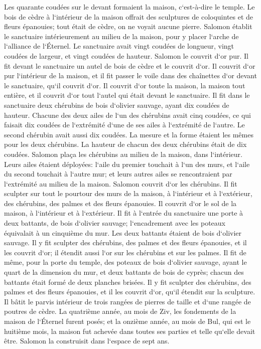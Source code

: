 \verse Les quarante coudées sur le devant formaient la maison, c`est-à-dire le temple. 
\verse Le bois de cèdre à l`intérieur de la maison offrait des sculptures de coloquintes et de fleurs épanouies; tout était de cèdre, on ne voyait aucune pierre. 
\verse Salomon établit le sanctuaire intérieurement au milieu de la maison, pour y placer l`arche de l`alliance de l`Éternel. 
\verse Le sanctuaire avait vingt coudées de longueur, vingt coudées de largeur, et vingt coudées de hauteur. Salomon le couvrit d`or pur. Il fit devant le sanctuaire un autel de bois de cèdre et le couvrit d`or. 
\verse Il couvrit d`or pur l`intérieur de la maison, et il fit passer le voile dans des chaînettes d`or devant le sanctuaire, qu`il couvrit d`or. 
\verse Il couvrit d`or toute la maison, la maison tout entière, et il couvrit d`or tout l`autel qui était devant le sanctuaire. 
\verse Il fit dans le sanctuaire deux chérubins de bois d`olivier sauvage, ayant dix coudées de hauteur. 
\verse Chacune des deux ailes de l`un des chérubins avait cinq coudées, ce qui faisait dix coudées de l`extrémité d`une de ses ailes à l`extrémité de l`autre. 
\verse Le second chérubin avait aussi dix coudées. La mesure et la forme étaient les mêmes pour les deux chérubins. 
\verse La hauteur de chacun des deux chérubins était de dix coudées. 
\verse Salomon plaça les chérubins au milieu de la maison, dans l`intérieur. Leurs ailes étaient déployées: l`aile du premier touchait à l`un des murs, et l`aile du second touchait à l`autre mur; et leurs autres ailes se rencontraient par l`extrémité au milieu de la maison. 
\verse Salomon couvrit d`or les chérubins. 
\verse Il fit sculpter sur tout le pourtour des murs de la maison, à l`intérieur et à l`extérieur, des chérubins, des palmes et des fleurs épanouies. 
\verse Il couvrit d`or le sol de la maison, à l`intérieur et à l`extérieur. 
\verse Il fit à l`entrée du sanctuaire une porte à deux battants, de bois d`olivier sauvage; l`encadrement avec les poteaux équivalait à un cinquième du mur. 
\verse Les deux battants étaient de bois d`olivier sauvage. Il y fit sculpter des chérubins, des palmes et des fleurs épanouies, et il les couvrit d`or; il étendit aussi l`or sur les chérubins et sur les palmes. 
\verse Il fit de même, pour la porte du temple, des poteaux de bois d`olivier sauvage, ayant le quart de la dimension du mur, et deux battants de bois de cyprès; 
\verse chacun des battants était formé de deux planches brisées. 
\verse Il y fit sculpter des chérubins, des palmes et des fleurs épanouies, et il les couvrit d`or, qu`il étendit sur la sculpture. 
\verse Il bâtit le parvis intérieur de trois rangées de pierres de taille et d`une rangée de poutres de cèdre. 
\verse La quatrième année, au mois de Ziv, les fondements de la maison de l`Éternel furent posés; 
\verse et la onzième année, au mois de Bul, qui est le huitième mois, la maison fut achevée dans toutes ses parties et telle qu`elle devait être. Salomon la construisit dans l`espace de sept ans. 

